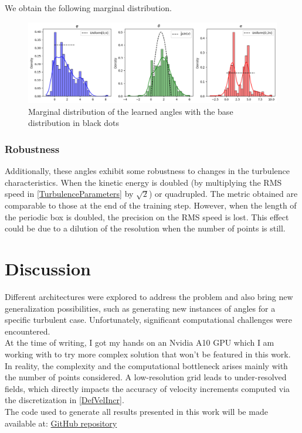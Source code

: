 \documentclass[a4paper,12pt]{article}
\theoremstyle{definition}
\begin{document}
We obtain the following marginal distribution.
\begin{figure}[H]
    \centering 
    \includegraphics[width=1.0\linewidth]{illustrations/AnglesDistributionLearned.png}
    \caption{Marginal distribution of the learned angles with the base distribution in black dots}
\end{figure}

\subsubsection{Robustness}
Additionally, these angles exhibit some robustness to changes in the turbulence characteristics. When the kinetic energy is doubled (by multiplying the RMS speed in \ref{TurbulenceParameters} by $\sqrt{2}$) or quadrupled. The metric obtained are comparable to those at the end of the training step. However, when the length of the periodic box is doubled, the precision on the RMS speed is lost. This effect could be due to a dilution of the resolution when the number of points is still. 
\section{Discussion} \label{Discussion}

Different architectures were explored to address the problem and also bring new generalization possibilities, such as generating new instances of angles for a specific turbulent case. Unfortunately, significant computational challenges were encountered. \\
At the time of writing, I got my hands on an Nvidia A10 GPU which I am working with to try more complex solution that won't be featured in this work. \\
In reality, the complexity and the computational bottleneck arises mainly with the number of points considered. A low-resolution grid leads to under-resolved fields, which directly impacts the accuracy of velocity increments computed via the discretization in \ref{DefVelIncr}. \\
The code used to generate all results presented in this work will be made available at: \href{https://github.com/SamyBraik/InternshipCode}{GitHub repository}
\newpage
\end{document}
